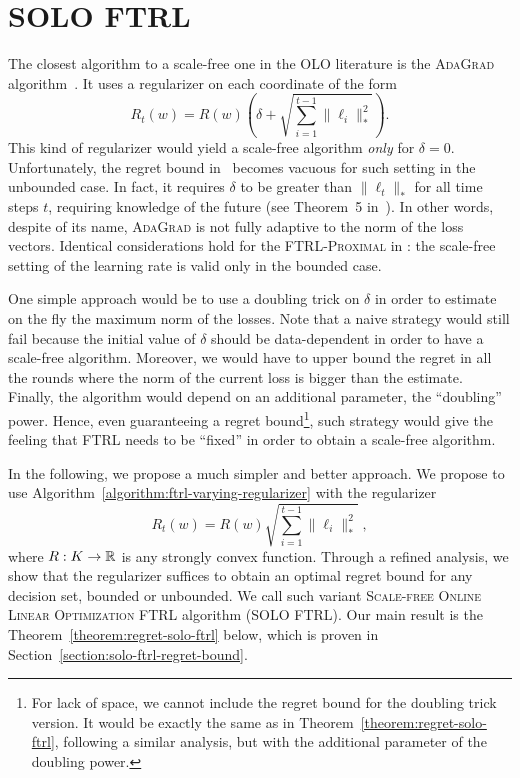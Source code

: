 \section{\textsc{SOLO FTRL}}
\label{section:solo-ftrl}

The closest algorithm to a scale-free one in the OLO literature is the
\textsc{AdaGrad} algorithm~\cite{Duchi-Hazan-Singer-2011}.  It uses a
regularizer on each coordinate of the form
\begin{equation*}
R_t(w) = R(w) \left(\delta + \sqrt{\sum_{i=1}^{t-1} \|\ell_i\|_*^2} \right).
\end{equation*}
This kind of regularizer would yield a scale-free algorithm \emph{only} for
$\delta=0$.  Unfortunately, the regret bound in~\cite{Duchi-Hazan-Singer-2011}
becomes vacuous for such setting in the unbounded case. In fact, it requires
$\delta$ to be greater than $\|\ell_t\|_*$ for all time steps $t$, requiring
knowledge of the future (see Theorem~5 in~\cite{Duchi-Hazan-Singer-2011}). In
other words, despite of its name, \textsc{AdaGrad} is not fully adaptive to the
norm of the loss vectors. Identical considerations hold for the
\textsc{FTRL-Proximal} in \cite{McMahan-Streeter-2010,McMahan-2014}: the
scale-free setting of the learning rate is valid only in the bounded case.

One simple approach would be to use a doubling trick on $\delta$ in order to
estimate on the fly the maximum norm of the losses. Note that a naive strategy
would still fail because the initial value of $\delta$ should be data-dependent
in order to have a scale-free algorithm. Moreover, we would have to upper bound
the regret in all the rounds where the norm of the current loss is bigger than
the estimate. Finally, the algorithm would depend on an additional parameter,
the ``doubling'' power. Hence, even guaranteeing a regret bound\footnote{For
lack of space, we cannot include the regret bound for the doubling trick
version. It would be exactly the same as in
Theorem~\ref{theorem:regret-solo-ftrl}, following a similar analysis, but with
the additional parameter of the doubling power.}, such strategy would give the
feeling that \textsc{FTRL} needs to be ``fixed'' in order to obtain a
scale-free algorithm.

In the following, we propose a much simpler and better approach.  We propose to
use Algorithm~\ref{algorithm:ftrl-varying-regularizer} with the regularizer
\begin{equation*}
\label{equation:solo-ftrl-regularizer}
R_t(w) = R(w) \sqrt{\sum_{i=1}^{t-1} \|\ell_i\|_*^2} \; ,
\end{equation*}
where $R:K \to \mathbb{R}$ is any strongly convex function. Through a refined analysis,
we show that the regularizer suffices to obtain an optimal regret bound for any
decision set, bounded or unbounded.  We call such variant \textsc{Scale-free
Online Linear Optimization FTRL} algorithm (\textsc{SOLO FTRL}).  Our main
result is the Theorem~\ref{theorem:regret-solo-ftrl} below, which is proven in
Section~\ref{section:solo-ftrl-regret-bound}.

